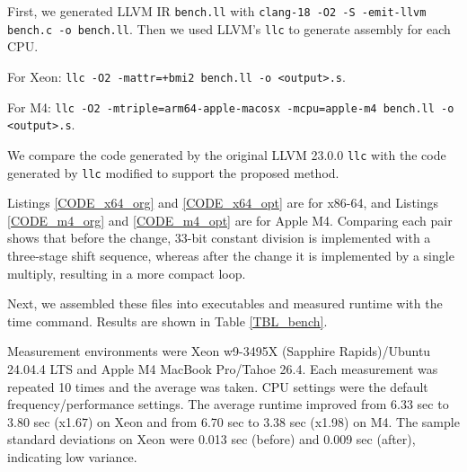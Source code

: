 \documentclass{article}
\begin{document}
First, we generated LLVM IR \texttt{bench.ll} with
\texttt{clang-18 -O2 -S -emit-llvm bench.c -o bench.ll}.
Then we used LLVM's \texttt{llc} to generate assembly for each CPU.

\noindent
For Xeon:
\texttt{llc -O2 -mattr=+bmi2 bench.ll -o <output>.s}.

\noindent
For M4:
\texttt{llc -O2 -mtriple=arm64-apple-macosx -mcpu=apple-m4 bench.ll -o <output>.s}.

We compare the code generated by the original LLVM 23.0.0 \texttt{llc} with the code generated by \texttt{llc} modified to support the proposed method.





Listings \ref{CODE_x64_org} and \ref{CODE_x64_opt} are for x86-64, and Listings \ref{CODE_m4_org} and \ref{CODE_m4_opt} are for Apple M4.
Comparing each pair shows that before the change, 33-bit constant division is implemented with a three-stage shift sequence,
whereas after the change it is implemented by a single multiply, resulting in a more compact loop.

Next, we assembled these files into executables and measured runtime with the time command.
Results are shown in Table \ref{TBL_bench}.


Measurement environments were Xeon w9-3495X (Sapphire Rapids)/Ubuntu 24.04.4 LTS and Apple M4 MacBook Pro/Tahoe 26.4.
Each measurement was repeated 10 times and the average was taken.
CPU settings were the default frequency/performance settings.
The average runtime improved from 6.33 sec to 3.80 sec (x1.67) on Xeon and from 6.70 sec to 3.38 sec (x1.98) on M4.
The sample standard deviations on Xeon were 0.013 sec (before) and 0.009 sec (after), indicating low variance.
\end{document}
